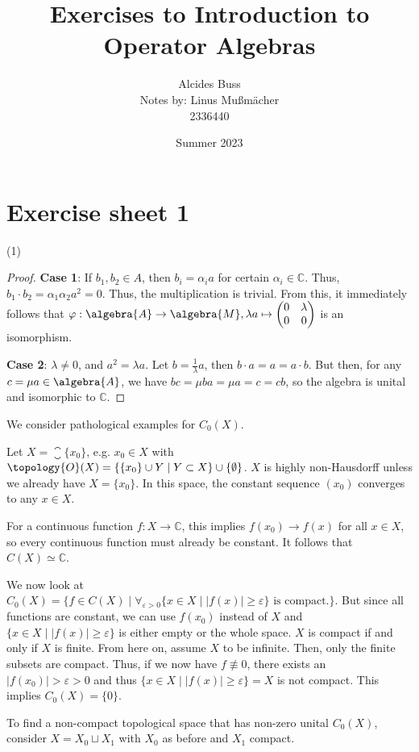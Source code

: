 \documentclass[a4paper]{article}
\title{Exercises to Introduction to Operator Algebras}
\author{Alcides Buss\\Notes by: Linus Mußmächer\\2336440}
\date{Summer 2023}
\let\oldsection\section
\renewcommand\section{\newpage\oldsection}
\let\oldepsilon\epsilon
\let\epsilon\varepsilon
\let\varepsilon\oldepsilon
\let\oldphi\phi
\let\phi\varphi
\let\varphi\oldphi
\newcommand{\qmatrix}[1]{\ensuremath{\left(\begin{matrix}#1\end{matrix}\right)}}
\begin{document}
\maketitle


\tableofcontents

\newpage

\section{Exercise sheet 1}

\begin{exercise}
	(1)
\end{exercise}

\begin{proof}
	\textbf{Case 1}: If $b_1, b_2 \in A$, then $b_i = \alpha_i a$ for certain $\alpha_i \in \mathbb{C}$. Thus, $b_1 \cdot b_2 = \alpha_1 \alpha_2 a^2 = 0$. Thus, the multiplication is trivial. From this, it immediately follows that $\phi: \algebra{A} \to \algebra{M}, \lambda a \mapsto \qmatrix{0 & \lambda \\ 0 & 0}$ is an isomorphism.

	\textbf{Case 2}: $\lambda \neq 0$, and $a^2 = \lambda a$. Let $b = \frac{1}{\lambda} a$, then $b \cdot a = a = a \cdot b$. But then, for any $c = \mu a \in \algebra{A}$, we have $b c = \mu b a = \mu a = c = c b$, so the algebra is unital and isomorphic to $\mathbb{C}$.
\end{proof}


\begin{exercise}[2]
	We consider pathological examples for $C_0(X)$.

	Let $X = \closure{\{x_0\}}$, e.g. $x_0 \in X$ with $\topology{O}(X) = \{\{x_0\} \cup Y \mid Y \subset X\} \cup \{\emptyset\}$. $X$ is highly non-Hausdorff unless we already have $X = \{x_0\}$.	In this space, the constant sequence $(x_0)$ converges to any $x \in X$.

	For a continuous function $f: X \to \mathds{C}$, this implies $f(x_0) \to f(x)$ for all $x \in X$, so every continuous function must already be constant. It follows that $C(X) \simeq \mathds{C}$.

	We now look at $C_0(X) = \{f \in C(X) \mid \forall_{\epsilon > 0} \{x \in X \mid  |f(x)| \geq \epsilon \} \text{ is compact.}\}$. But since all functions are constant, we can use $f(x_0)$ instead of $X$ and $\{x \in X \mid  |f(x)| \geq \epsilon \}$ is either empty or the whole space. $X$ is compact if and only if $X$ is finite. From here on, assume $X$ to be infinite. Then, only the finite subsets are compact. Thus, if we now have $f \not \equiv 0$, there exists an $|f(x_0)| > \epsilon > 0$ and thus $\{x \in X \mid  |f(x)| \geq \epsilon \} = X$ is not compact. This implies $C_0(X) = \{0\}$.

	To find a non-compact topological space that has non-zero unital $C_0(X)$, consider $X = X_0 \sqcup X_1$ with $X_0$ as before and $X_1$ compact.
\end{exercise}
\end{document}

